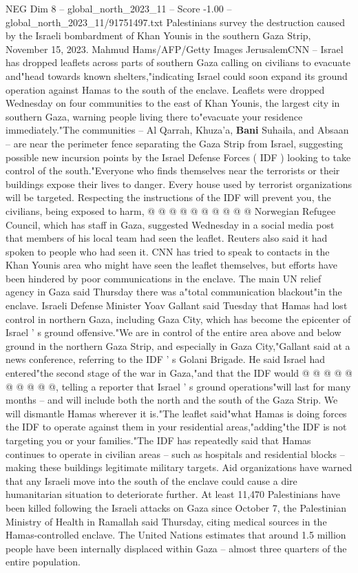 \begin{textsample}{NEG Dim 8 – global\_north\_2023\_11 – Score -1.00 – global\_north\_2023\_11/91751497.txt}  \label{ex:f8_neg_330}
Palestinians survey the destruction caused by the Israeli bombardment of Khan Younis in the southern Gaza Strip, November 15, 2023.
Mahmud Hams/AFP/Getty Images JerusalemCNN -- Israel has dropped leaflets across parts of southern Gaza calling on civilians to evacuate and"head towards known shelters,"indicating Israel could soon expand its ground operation against Hamas to the south of the enclave.
Leaflets were dropped Wednesday on four communities to the east of Khan Younis, the largest city in southern Gaza, warning people living there to"evacuate your residence immediately."The communities -- Al Qarrah, Khuza'a, \textbf{Bani} Suhaila, and Absaan -- are near the perimeter fence separating the Gaza Strip from Israel, suggesting possible new incursion points by the Israel Defense Forces ( IDF ) looking to take control of the south."Everyone who finds themselves near the terrorists or their buildings expose their lives to danger.
Every house used by terrorist organizations will be targeted.
Respecting the instructions of the IDF will prevent you, the civilians, being exposed to harm, @ @ @ @ @ @ @ @ @ @ Norwegian Refugee Council, which has staff in Gaza, suggested Wednesday in a social media post that members of his local team had seen the leaflet.
Reuters also said it had spoken to people who had seen it.
CNN has tried to speak to contacts in the Khan Younis area who might have seen the leaflet themselves, but efforts have been hindered by poor communications in the enclave.
The main UN relief agency in Gaza said Thursday there was a"total communication blackout"in the enclave.
Israeli Defense Minister Yoav Gallant said Tuesday that Hamas had lost control in northern Gaza, including Gaza City, which has become the epicenter of Israel ' s ground offensive."We are in control of the entire area above and below ground in the northern Gaza Strip, and especially in Gaza City,"Gallant said at a news conference, referring to the IDF ' s Golani Brigade.
He said Israel had entered"the second stage of the war in Gaza,"and that the IDF would @ @ @ @ @ @ @ @ @ @, telling a reporter that Israel ' s ground operations"will last for many months -- and will include both the north and the south of the Gaza Strip.
We will dismantle Hamas wherever it is."The leaflet said"what Hamas is doing forces the IDF to operate against them in your residential areas,"adding"the IDF is not targeting you or your families."The IDF has repeatedly said that Hamas continues to operate in civilian areas -- such as hospitals and residential blocks -- making these buildings legitimate military targets.
Aid organizations have warned that any Israeli move into the south of the enclave could cause a dire humanitarian situation to deteriorate further.
At least 11,470 Palestinians have been killed following the Israeli attacks on Gaza since October 7, the Palestinian Ministry of Health in Ramallah said Thursday, citing medical sources in the Hamas-controlled enclave.
The United Nations estimates that around 1.5 million people have been internally displaced within Gaza -- almost three quarters of the entire population.

\end{textsample}
